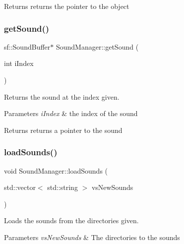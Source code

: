 \begin{DoxyReturn}{Returns}
returns the pointer to the object 
\end{DoxyReturn}
\mbox{\label{class_sound_manager_a4710f7e9c6658adf6e47b5513a1c5e9f}} 
\subsubsection{\texorpdfstring{get\+Sound()}{getSound()}}
{\footnotesize\ttfamily sf\+::\+Sound\+Buffer$\ast$ Sound\+Manager\+::get\+Sound (\begin{DoxyParamCaption}\item[{int}]{i\+Index }\end{DoxyParamCaption})}



Returns the sound at the index given. 


\begin{DoxyParams}{Parameters}
{\em i\+Index} & the index of the sound \\
\hline
\end{DoxyParams}
\begin{DoxyReturn}{Returns}
returns a pointer to the sound 
\end{DoxyReturn}
\mbox{\label{class_sound_manager_ad874a868b3a3f0ae5c733d062c0a43c8}} 
\subsubsection{\texorpdfstring{load\+Sounds()}{loadSounds()}}
{\footnotesize\ttfamily void Sound\+Manager\+::load\+Sounds (\begin{DoxyParamCaption}\item[{std\+::vector$<$ std\+::string $>$}]{vs\+New\+Sounds }\end{DoxyParamCaption})}



Loads the sounds from the directories given. 


\begin{DoxyParams}{Parameters}
{\em vs\+New\+Sounds} & The directories to the sounds \\
\hline
\end{DoxyParams}


